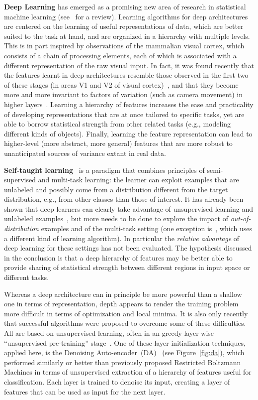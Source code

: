 \documentclass{article} %
\begin{document}
{\bf Deep Learning} has emerged as a promising new area of research in
statistical machine learning (see~\citet{Bengio-2009} for a review).
Learning algorithms for deep architectures are centered on the learning
of useful representations of data, which are better suited to the task at hand,
and are organized in a hierarchy with multiple levels.
This is in part inspired by observations of the mammalian visual cortex, 
which consists of a chain of processing elements, each of which is associated with a
different representation of the raw visual input. In fact,
it was found recently that the features learnt in deep architectures resemble
those observed in the first two of these stages (in areas V1 and V2
of visual cortex)~\citep{HonglakL2008}, and that they become more and
more invariant to factors of variation (such as camera movement) in
higher layers~\citep{Goodfellow2009}.
Learning a hierarchy of features increases the
ease and practicality of developing representations that are at once
tailored to specific tasks, yet are able to borrow statistical strength
from other related tasks (e.g., modeling different kinds of objects). Finally, learning the
feature representation can lead to higher-level (more abstract, more
general) features that are more robust to unanticipated sources of
variance extant in real data.

{\bf Self-taught learning}~\citep{RainaR2007} is a paradigm that combines principles
of semi-supervised and multi-task learning: the learner can exploit examples
that are unlabeled and possibly come from a distribution different from the target
distribution, e.g., from other classes than those of interest. 
It has already been shown that deep learners can clearly take advantage of
unsupervised learning and unlabeled examples~\citep{Bengio-2009,WestonJ2008-small},
but more needs to be done to explore the impact
of {\em out-of-distribution} examples and of the multi-task setting
(one exception is~\citep{CollobertR2008}, which uses a different kind
of learning algorithm). In particular the {\em relative
advantage} of deep learning for these settings has not been evaluated.
The hypothesis discussed in the conclusion is that a deep hierarchy of features
may be better able to provide sharing of statistical strength
between different regions in input space or different tasks.

Whereas a deep architecture can in principle be more powerful than a
shallow one in terms of representation, depth appears to render the
training problem more difficult in terms of optimization and local minima.
It is also only recently that successful algorithms were proposed to
overcome some of these difficulties.  All are based on unsupervised
learning, often in an greedy layer-wise ``unsupervised pre-training''
stage~\citep{Bengio-2009}.  One of these layer initialization techniques,
applied here, is the Denoising
Auto-encoder~(DA)~\citep{VincentPLarochelleH2008-very-small} (see Figure~\ref{fig:da}), 
which
performed similarly or better than previously proposed Restricted Boltzmann
Machines in terms of unsupervised extraction of a hierarchy of features
useful for classification. Each layer is trained to denoise its
input, creating a layer of features that can be used as input for the next layer.  
\end{document}
